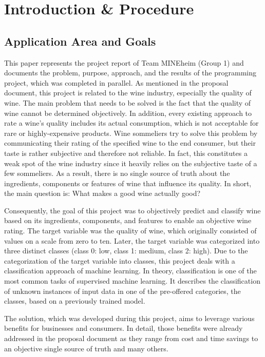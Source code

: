 \chapter{Introduction \& Procedure}
\section{Application Area and Goals}


This paper represents the project report of Team MINEheim (Group 1) and documents the problem, purpose, approach, and the results of the programming project, which was completed in parallel. As mentioned in the proposal document, this project is related to the wine industry, especially the quality of wine. The main problem that needs to be solved is the fact that the quality of wine cannot be determined objectively. In addition, every existing approach to rate a wine's quality includes its actual consumption, which is not acceptable for rare or highly-expensive products. Wine sommeliers try to solve this problem by communicating their rating of the specified wine to the end consumer, but their taste is rather subjective and therefore not reliable. In fact, this constitutes a weak spot of the wine industry since it heavily relies on the subjective taste of a few sommeliers. As a result, there is no single source of truth about the ingredients, components or features of wine that influence its quality. In short, the main question is: What makes a good wine actually good?

Consequently, the goal of this project was to objectively predict and classify wine based on its ingredients, components, and features to enable an objective wine rating. The target variable was the quality of wine, which originally consisted of values on a scale from zero to ten. Later, the target variable was categorized into three distinct classes (class 0: low, class 1: medium, class 2: high). Due to the categorization of the target variable into classes, this project deals with a classification approach of machine learning. In theory, classification is one of the most common tasks of supervised machine learning. It describes the classification of unknown instances of input data in one of the pre-offered categories, the classes, based on a previously trained model. \citep{Novakovic2010}

The solution, which was developed during this project, aims to leverage various benefits for businesses and consumers. In detail, those benefits were already addressed in the proposal document as they range from cost and time savings to an objective single source of truth and many others. 